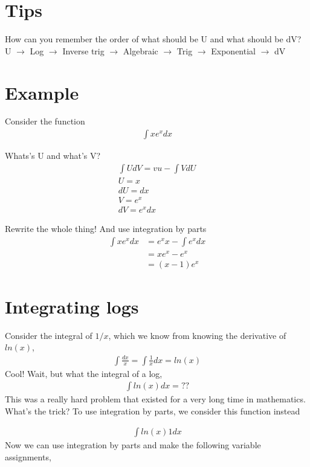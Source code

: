 \documentclass{article}
\begin{document}
\section{Tips}
How can you remember the order of what should be U and what should be dV? \\
U $\rightarrow$ Log $\rightarrow$ Inverse trig $\rightarrow$ Algebraic $\rightarrow$ Trig $\rightarrow$ Exponential $\rightarrow$ dV \\


\section{Example}
Consider the function 
\begin{align}
    \int x  e^x dx
\end{align}

Whats's U and what's V? 
\begin{align}
    \int U dV = vu - \int V dU\\
    U = x\\
    dU = dx \\
    V = e^x\\
    dV = e^x dx
\end{align}

Rewrite the whole thing! And use integration by parts
\begin{align}
    \int x e^x dx &= e^x x - \int e^x dx \\
    &= x e^x - e^x \\
    &= (x - 1) e^x
\end{align}


\section{Integrating logs}

Consider the integral of $1/x$, which we know from knowing the derivative of $ln(x)$,
\begin{align}
    \int \frac{dx}{x} = \int \frac{1}{x} dx = ln(x)
\end{align}
Cool! Wait, but what the integral of a log,
\begin{align}
    \int ln(x) dx = ??
\end{align}
This was a really hard problem that existed for a very long time in mathematics. What's the trick? To use integration by parts, we consider this function instead 

\begin{align}
    \int ln(x) 1 dx 
\end{align}
Now we can use integration by parts and make the following variable assignments,
\end{document}
